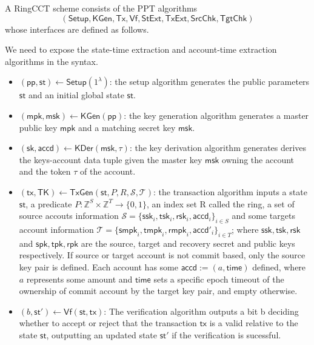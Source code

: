 \begin{definition}
    A RingCCT scheme consists of the PPT algorithms 
    \[(\mathsf{Setup},\mathsf{KGen,Tx,Vf,StExt,TxExt,SrcChk,TgtChk})\] 
    whose interfaces are defined as follows.
    \begin{todobox}
        We need to expose the state-time extraction and account-time extraction algorithms in the syntax. 
    \end{todobox}

    \begin{itemize}
        \item $(\mathsf{pp,st}) \gets \mathsf{Setup}(1^\lambda)$: the setup algorithm generates the public parameters $\mathsf{st}$ and an initial global state $\mathsf{st}$.
        \item $(\mathsf{mpk},\mathsf{msk}) \gets \mathsf{KGen}(\mathsf{pp})$: the key generation algorithm generates a master public key $\mathsf{mpk}$ and a matching secret key $\mathsf{msk}$.
        \item $(\mathsf{sk},\mathsf{accd}) \gets \mathsf{KDer}(\mathsf{msk, \tau})$: the key derivation algorithm generates derives the keys-account data tuple given the master key $\mathsf{msk}$ owning the account and the token $\tau$ of the account.
        \item $(\mathsf{tx,TK}) \gets \mathsf{TxGen}(\mathsf{st},P,R,\mathcal{S},\mathcal{T})$: the transaction algorithm inputs a state $\mathsf{st}$, a predicate $P: \mathbb{Z}^S \times \mathbb{Z}^T \rightarrow \{0,1\}$, an index set R called the ring, a set of source accouts information $\mathcal{S} = \{\mathsf{ssk}_i, \mathsf{tsk}_i, \mathsf{rsk}_i, \mathsf{accd}_i\}_{i\in S}$ and some targets account information $\mathcal{T} = \{\mathsf{smpk}_i, \mathsf{tmpk}_i, \mathsf{rmpk}_i, \mathsf{accd}'_i\}_{i\in T}$; where $\mathsf{ssk,tsk,rsk}$ and $\mathsf{spk,tpk,rpk}$ are the source, target and recovery secret and public keys respectively. If source or target account is not commit based, only the source key pair is defined. Each account has some $\mathsf{accd} := (a,\mathsf{time})$ defined, where $a$ represents some amount and $\mathsf{time}$ sets a specific epoch timeout of the ownership of commit account by the target key pair, and empty otherwise. 
        \item $(b,\mathsf{st}') \gets \mathsf{Vf}(\mathsf{st,tx})$: The verification algorithm outputs a bit b deciding whether to accept or reject that the transaction $\mathsf{tx}$ is a valid relative to the state $\mathsf{st}$, outputting an updated state $\mathsf{st}'$ if the verification is sucessful.

\end{itemize}
\end{definition}
